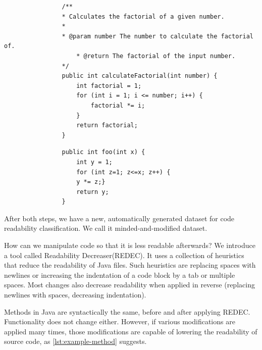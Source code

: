 \documentclass[%
class=scrreprt,
chapterprefix=false,%
open=right,%
twoside=false,%
paper=a4,%
logofile={Logo\_zentral\_farbig\_EN.png},%
thesistype=master,%
UKenglish,%
]{se2thesis}
\theoremstyle{definition}
\newcommand{\RDH}{Readability Decreaser\xspace}
\newcommand{\rdh}{REDEC\xspace}
\newcommand{\RDHa}{\RDH (\rdh)\xspace} %
\begin{document}
	\begin{listing}[tb]
		\begin{sublisting}{\linewidth}
			\begin{verbatim}
				/**
				* Calculates the factorial of a given number.
				*
				* @param number The number to calculate the factorial of.
					* @return The factorial of the input number.
				*/
				public int calculateFactorial(int number) {
					int factorial = 1;
					for (int i = 1; i <= number; i++) {
						factorial *= i;
					}
					return factorial;
				}
			\end{verbatim}
			\caption{An example of a simple and well readable Java method.}
			\label{lst:example-method-well}
		\end{sublisting}
		\vspace{1pt}
		
		\begin{sublisting}{\linewidth}
			\begin{verbatim}
				public int foo(int x) {
					int y = 1;
					for (int z=1; z<=x; z++) {
					y *= z;}
					return y;
				}
			\end{verbatim}
			\caption{The same example as in \autoref{lst:example-method-well} but modified for poor readability.}
			\label{lst:example-method-badly}
		\end{sublisting}
		\caption{Well readable (\autoref{lst:example-method-well}) vs. poorly readable (\autoref{lst:example-method-badly}) code.}
		\label{lst:example-method}
	\end{listing}
	
	
	After both steps, we have a new, automatically generated dataset for code readability classification. We call it minded-and-modified dataset.
	
	How can we manipulate code so that it is less readable afterwards? We introduce a tool called \RDHa. It uses a collection of heuristics that reduce the readability of Java files. Such heuristics are replacing spaces with newlines or increasing the indentation of a code block by a tab or multiple spaces. Most changes also decrease readability when applied in reverse (replacing newlines with spaces, decreasing indentation).
	
	Methods in Java are syntactically the same, before and after applying \rdh. Functionality does not change either. However, if various modifications are applied many times, those modifications are capable of lowering the readability of source code, as \autoref{lst:example-method} suggests.
\end{document}
